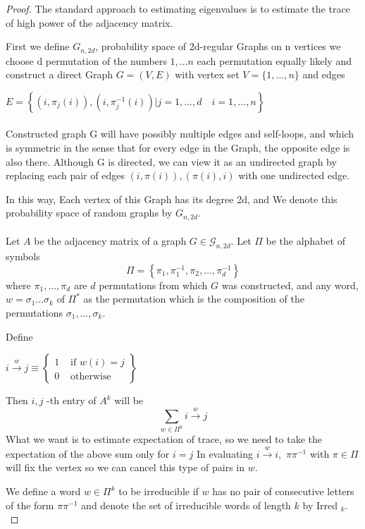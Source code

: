 \documentclass[oneside]{book}
\theoremstyle{definition}
\begin{document}
\begin{proof}
 The standard approach to estimating eigenvalues is to estimate the trace of high power of the adjacency matrix.\par
First we define ${G}_{n, 2d}$, probability space of 2d-regular Graphs on n vertices    we choose d permutation of the numbers ${1,\ldots n}$ each permutation equally likely and construct a direct Graph $G = (V,E) $ with  vertex set $V=\{1, \ldots, n\}$ and edges\par
$E=\left\{\left(i, \pi_{j}(i)\right),\left(i, \pi_{j}^{-1}(i)\right) | j=1, \ldots, d \quad i=1, \ldots, n\right\}$ \\\\
Constructed graph G will have possibly multiple edges and self-loops, and which is symmetric in the sense that for every edge in the Graph, the opposite edge is also there. Although G is directed, we can view it as an undirected graph by
replacing each pair of edges $(i, \pi(i)), (\pi(i), i) $ with one undirected edge.\par In this way, Each vertex of this Graph has its degree 2d, and  We denote
this probability space of random graphs by $G_{n,2d}$. \\\\
Let $A$ be the adjacency matrix of a graph $G \in \mathscr{G}_{n, 2 d}$. Let $\Pi$ be the alphabet of symbols
$$
\Pi=\left\{\pi_{1}, \pi_{1}^{-1}, \pi_{2}, \ldots, \pi_{d}^{-1}\right\}
$$
where  $\pi_{1}, \ldots, \pi_{d}$ are  $d$ permutations from which $G$ was constructed, and any word, $w=\sigma_{1} \ldots \sigma_{k}$ of $\Pi^{*}$ as the permutation which is the composition of the permutations $\sigma_{1}, \ldots, \sigma_{k} .$ \par
Define  \begin{center}
   $i \stackrel{w}{\rightarrow} j \equiv\left\{\begin{array}{ll}
1 & \text { if  }  w(i)=j \\
0 & \text { otherwise }
\end{array}\right\}$ 
\end{center}
Then  $i, j$ -th entry of $A^{k}$ will be 
$$
\sum_{w \in \Pi^{k}} i \stackrel{w}{\rightarrow} j
$$
What we want is  to estimate expectation of  trace, so we need to take the expectation of the above sum only for  $i = j$      
 In evaluating $i \stackrel{w}{\rightarrow} i,$  $\pi \pi^{-1}$ with $\pi \in \Pi $    will fix the vertex so we can cancel this type of pairs in  $w$.\par
 We define a word $w \in \Pi^{k}$ to be irreducible if $w$ has no pair of consecutive letters of the form $\pi \pi^{-1}$ and denote the set of irreducible words of length $k$ by Irred $_{k} .$\par

\end{proof}
\end{document}
